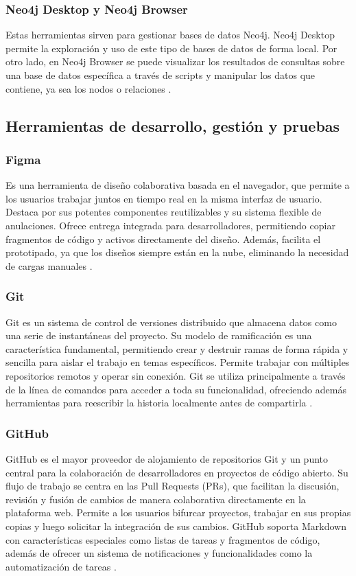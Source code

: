 \subsubsection{Neo4j Desktop y Neo4j Browser}
Estas herramientas sirven para gestionar bases de datos Neo4j. Neo4j Desktop permite la exploración y uso de este tipo de bases de datos de forma local. Por otro lado, en Neo4j Browser se puede visualizar los resultados de consultas sobre una base de datos específica a través de scripts y manipular los datos que contiene, ya sea los nodos o relaciones \cite{baton2017learning}.

\subsection{Herramientas de desarrollo, gestión y pruebas}
\subsubsection{Figma}
Es una herramienta de diseño colaborativa basada en el navegador, que permite a los usuarios trabajar juntos en tiempo real en la misma interfaz de usuario. Destaca por sus potentes componentes reutilizables y su sistema flexible de anulaciones. Ofrece entrega integrada para desarrolladores, permitiendo copiar fragmentos de código y activos directamente del diseño. Además, facilita el prototipado, ya que los diseños siempre están en la nube, eliminando la necesidad de cargas manuales \cite{staiano2022designing}.

\subsubsection{Git}
Git es un sistema de control de versiones distribuido que almacena datos como una serie de instantáneas del proyecto. Su modelo de ramificación es una característica fundamental, permitiendo crear y destruir ramas de forma rápida y sencilla para aislar el trabajo en temas específicos. Permite trabajar con múltiples repositorios remotos y operar sin conexión. Git se utiliza principalmente a través de la línea de comandos para acceder a toda su funcionalidad, ofreciendo además herramientas para reescribir la historia localmente antes de compartirla \cite{chacon2014pro}.

\subsubsection{GitHub}
GitHub es el mayor proveedor de alojamiento de repositorios Git y un punto central para la colaboración de desarrolladores en proyectos de código abierto. Su flujo de trabajo se centra en las Pull Requests (PRs), que facilitan la discusión, revisión y fusión de cambios de manera colaborativa directamente en la plataforma web. Permite a los usuarios bifurcar proyectos, trabajar en sus propias copias y luego solicitar la integración de sus cambios. GitHub soporta Markdown con características especiales como listas de tareas y fragmentos de código, además de ofrecer un sistema de notificaciones y funcionalidades como la automatización de tareas \cite{chacon2014pro}.

